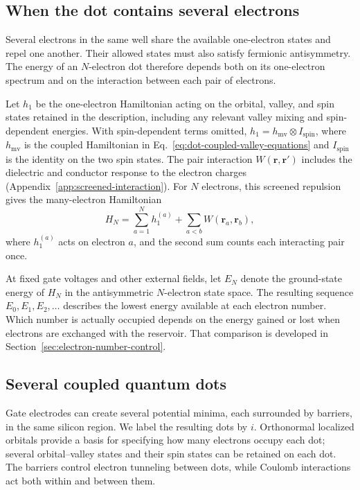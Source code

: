 \subsection{When the dot contains several electrons}

Several electrons in the same well share the available one-electron
states and repel one another. Their allowed states must also satisfy
fermionic antisymmetry. The energy of an $N$-electron dot therefore
depends both on its one-electron spectrum and on the interaction
between each pair of electrons.

Let $h_1$ be the one-electron Hamiltonian acting on the orbital, valley,
and spin states retained in the description, including any relevant
valley mixing and spin-dependent energies. With spin-dependent
terms omitted, $h_1=h_{\mathrm{mv}}\otimes I_{\mathrm{spin}}$,
where $h_{\mathrm{mv}}$ is the coupled Hamiltonian in
Eq.~\eqref{eq:dot-coupled-valley-equations} and
$I_{\mathrm{spin}}$ is the identity on the two spin states.
The pair interaction $W(\mathbf r,\mathbf r')$ includes the dielectric
and conductor response to the electron charges
(Appendix~\ref{app:screened-interaction}). For $N$ electrons, this
screened repulsion gives the many-electron Hamiltonian
\begin{equation}
  H_N=\sum_{a=1}^{N}h_1^{(a)}
       +\sum_{a<b}W(\mathbf r_a,\mathbf r_b),
  \label{eq:dot-interacting-hamiltonian}
\end{equation}
where $h_1^{(a)}$ acts on electron $a$, and the second sum counts
each interacting pair once.

At fixed gate voltages and other external fields, let $E_N$ denote
the ground-state energy of $H_N$ in the antisymmetric $N$-electron
state space. The resulting sequence $E_0,E_1,E_2,\ldots$
describes the lowest energy available at each electron number.
Which number is actually occupied depends on the energy gained or
lost when electrons are exchanged with the reservoir. That comparison
is developed in Section~\ref{sec:electron-number-control}.

\subsection{Several coupled quantum dots}
\label{sec:multiple-quantum-dots}

Gate electrodes can create several potential minima, each surrounded
by barriers, in the same silicon region. We label the resulting
dots by $i$. Orthonormal localized orbitals provide a basis for specifying how
many electrons occupy each dot; several orbital--valley states and
their spin states can be retained on each dot. The barriers control
electron tunneling between dots, while Coulomb interactions act
both within and between them.

